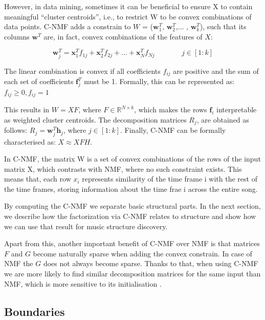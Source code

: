 However, in data mining, sometimes it can be beneficial to ensure X to contain meaningful “cluster centroids”, i.e., to restrict W to be convex combinations of data points.
C-NMF adds a constrain to $W$ = ($\boldsymbol{w}_{1}^{T}$, $\boldsymbol{w}_{2}^{T}$,... ,  $\boldsymbol{w}_{k}^{T}$),  such that its columns  $\boldsymbol{w}^{T}$  are, in fact,  convex combinations of the features of $X$:

\begin{equation}
\boldsymbol{w}_{j}^{T} = \boldsymbol{x}_{1}^{T}f_{1j} + \boldsymbol{x}_{2}^{T}f_{2j} + ... + \boldsymbol{x}_{N}^{T}f_{Nj}  \hspace{45pt}   j \in [1 : k]
\end{equation}

The linear combination is convex if all coefficients $f_{ij}$ are positive and the sum of each set of coefficients  $\boldsymbol{f}^{T}_{j}$ must be 1. Formally, this can be represented as:
$f_{ij} \geq 0,  f_{ij} = 1 $

This results in $W = XF$, where $F \in \mathbb{R}^{N \times k}$, which makes the rows $\boldsymbol{f}_{i}$ interpretable as weighted cluster centroids. The decomposition matrices $R_{j}$, are obtained as follows:  $R_{j} =  \boldsymbol{w}^{T}_{j}\boldsymbol{h}_{j}$, where $j \in [1 : k]$. Finally, C-NMF can be formally characterised as: $X \approx XFH$.

In C-NMF, the matrix W is a set of convex combinations of the rows of the input matrix X, which contrasts with NMF, where no such constraint exists. This means that, each row $x_{i}$ represents similarity of the time frame i with the rest of the time frames, storing information about the time frae i across the entire song.

By computing the C-NMF we separate basic structural parts. In the next section, we describe how the factorization via C-NMF relates to structure and show how we can use that result for music structure discovery. 

Apart from this, another important benefit of C-NMF over NMF is that matrices $F$ and $G$ become naturally sparse when adding the convex constrain. In case of NMF the $G$ does not always become sparse. Thanks to that, when using C-NMF we are more likely to find similar decomposition matrices for the same input than NMF, which is more sensitive to its initialisation \cite{Nieto}. 

\vspace{10pt}


\subsection{Boundaries}

